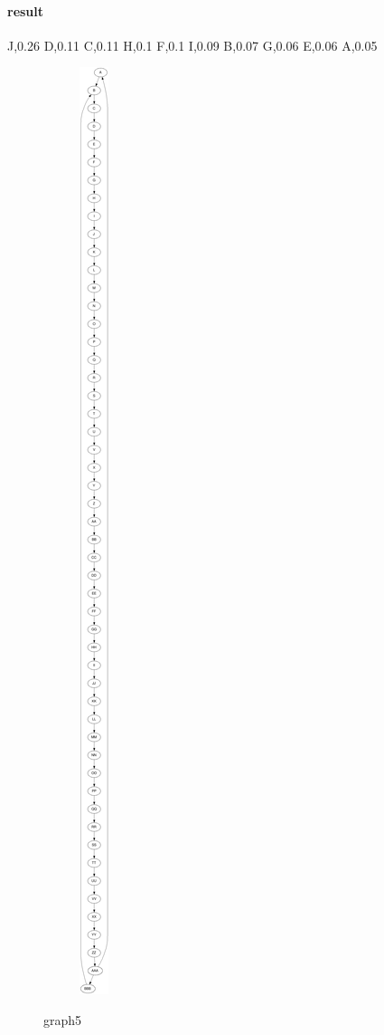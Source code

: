 \documentclass{article}
\begin{document}
        \paragraph{result}

J,0.26
D,0.11
C,0.11
H,0.1
F,0.1
I,0.09
B,0.07
G,0.06
E,0.06
A,0.05
      \newpage

\begin{figure}[h!]
  \centering
  \begin{subfigure}[b]{.05\linewidth}
    \includegraphics[width=\linewidth]{graph5.jpg}
  \end{subfigure}
  \caption{graph5}

  \end{figure}
  
\end{document}
